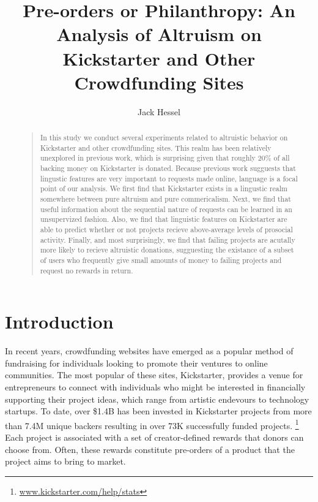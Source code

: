 \documentclass[letterpaper]{article}
\begin{document}
%
\title{Pre-orders or Philanthropy: An Analysis of Altruism on Kickstarter and Other Crowdfunding Sites}
\author{Jack Hessel}
\maketitle
\begin{abstract}
\begin{quote}
In this study we conduct several experiments related to altruistic behavior on Kickstarter and other crowdfunding sites. This realm has been relatively unexplored in previous work, which is surprising given that roughly 20\% of all backing money on Kickstarter is donated. Because previous work sugguests that lingustic features are very important to requests made online, language is a focal point of our analysis. We first find that Kickstarter exists in a lingustic realm somewhere between pure altruism and pure commericalism. Next, we find that useful information about the sequential nature of requests can be learned in an unsupervized fashion. Also, we find that linguistic features on Kickstarter are able to predict whether or not projects recieve above-average levels of prosocial activity. Finally, and most surprisingly, we find that failing projects are acutally more likely to recieve altruistic donations, sugguesting the existance of a subset of users who frequently give small amounts of money to failing projects and request no rewards in return.
\end{quote}
\end{abstract}

\section{Introduction}

In recent years, crowdfunding websites have emerged as a popular method of fundraising for individuals looking to promote their ventures to online communities. The most popular of these sites, Kickstarter, provides a venue for entrepreneurs to connect with individuals who might be interested in financially supporting their project ideas, which range from artistic endevours to technology startups. To date, over \$1.4B has been invested in Kickstarter projects from more than 7.4M unique backers resulting in over 73K successfully funded projects. \footnote{ \url{www.kickstarter.com/help/stats}} Each project is associated with a set of creator-defined rewards that donors can choose from. Often, these rewards constitute pre-orders of a product that the project aims to bring to market.
\end{document}
